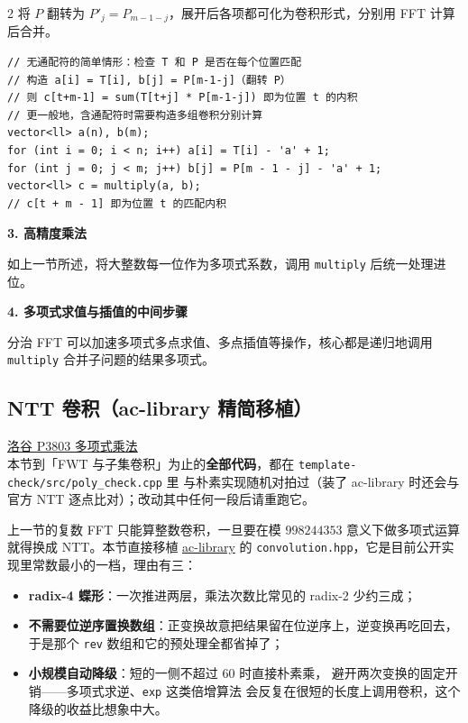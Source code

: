 \begin{multicols*}{2}
		将 $P$ 翻转为 $P'_j = P_{m-1-j}$，展开后各项都可化为卷积形式，分别用 FFT 计算后合并。

		\begin{verbatim}
// 无通配符的简单情形：检查 T 和 P 是否在每个位置匹配
// 构造 a[i] = T[i], b[j] = P[m-1-j]（翻转 P）
// 则 c[t+m-1] = sum(T[t+j] * P[m-1-j]) 即为位置 t 的内积
// 更一般地，含通配符时需要构造多组卷积分别计算
vector<ll> a(n), b(m);
for (int i = 0; i < n; i++) a[i] = T[i] - 'a' + 1;
for (int j = 0; j < m; j++) b[j] = P[m - 1 - j] - 'a' + 1;
vector<ll> c = multiply(a, b);
// c[t + m - 1] 即为位置 t 的匹配内积
		\end{verbatim}

		\textbf{3. 高精度乘法}

		如上一节所述，将大整数每一位作为多项式系数，调用 \texttt{multiply} 后统一处理进位。

		\textbf{4. 多项式求值与插值的中间步骤}

		分治 FFT 可以加速多项式多点求值、多点插值等操作，核心都是递归地调用 \texttt{multiply} 合并子问题的结果多项式。

	\end{multicols*} %

		\subsection{NTT 卷积（ac-library 精简移植）}

		\href{https://www.luogu.com.cn/problem/P3803}{洛谷 P3803 多项式乘法} \\

		本节到「FWT 与子集卷积」为止的\textbf{全部代码}，都在 \texttt{template-check/src/poly\_check.cpp} 里
		与朴素实现随机对拍过（装了 ac-library 时还会与官方 NTT 逐点比对）；改动其中任何一段后请重跑它。

		上一节的复数 FFT 只能算整数卷积，一旦要在模 $998244353$ 意义下做多项式运算就得换成
		NTT。本节直接移植 \href{https://github.com/atcoder/ac-library}{ac-library} 的
		\texttt{convolution.hpp}，它是目前公开实现里常数最小的一档，理由有三：

		\begin{itemize}
			\item \textbf{radix-4 蝶形}：一次推进两层，乘法次数比常见的 radix-2 少约三成；
			\item \textbf{不需要位逆序置换数组}：正变换故意把结果留在位逆序上，逆变换再吃回去，
			      于是那个 \texttt{rev} 数组和它的预处理全都省掉了；
			\item \textbf{小规模自动降级}：短的一侧不超过 $60$ 时直接朴素乘，
			      避开两次变换的固定开销——多项式求逆、\texttt{exp} 这类倍增算法
			      会反复在很短的长度上调用卷积，这个降级的收益比想象中大。
		\end{itemize}

